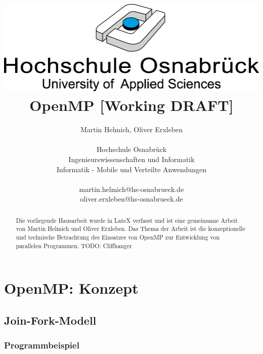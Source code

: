 \documentclass{lni}
\begin{document}
\author{
	Martin Helmich, Oliver Erxleben \\ 
	\\ 
	Hochschule Osnabrück \\ 
	Ingenieurswissenschaften und Informatik \\ 
	Informatik - Mobile und Verteilte Anwendungen \\ 
	\\ 
	martin.helmich@hs-osnabrueck.de \\
	oliver.erxleben@hs-osnabrueck.de
}

\title{\includegraphics[scale=0.75,keepaspectratio]{img/hs_os.png}\linebreak \linebreak OpenMP [Working DRAFT]}

\maketitle

\tableofcontents

\begin{abstract}
Die vorliegende Hausarbeit wurde in LateX verfasst und ist eine gemeinsame Arbeit von Martin Helmich und Oliver Erxleben. Das Thema der Arbeit ist die konzeptionelle und technische Betrachtung des Einsatzes von OpenMP zur Entwicklung von parallelen Programmen. TODO: Cliffhanger
\end{abstract}

\pagebreak %

\setcounter{page}{1} %
\section{OpenMP: Konzept}
\cite{omp08}

\subsection{Join-Fork-Modell}
\subsubsection{Programmbeispiel}
\end{document}
